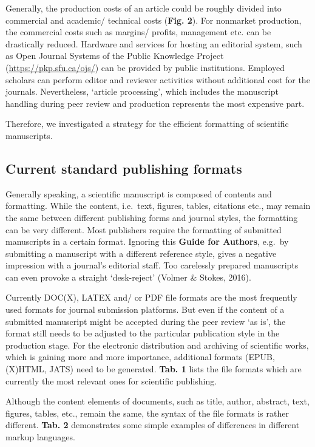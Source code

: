 \documentclass[10pt,fleqn]{wlpeerj}
\begin{document}
Generally, the production costs of an article could be roughly divided
into commercial and academic/ technical costs (\textbf{Fig. 2}). For
nonmarket production, the commercial costs such as margins/ profits,
management etc. can be drastically reduced. Hardware and services for
hosting an editorial system, such as Open Journal Systems of the Public
Knowledge Project (\url{https://pkp.sfu.ca/ojs/}) can be provided by
public institutions. Employed scholars can perform editor and reviewer
activities without additional cost for the journals. Nevertheless,
`article processing', which includes the manuscript handling during peer
review and production represents the most expensive part.

Therefore, we investigated a strategy for the efficient formatting of
scientific manuscripts.

\subsection{Current standard publishing
formats}\label{current-standard-publishing-formats}

Generally speaking, a scientific manuscript is composed of contents and
formatting. While the content, i.e.~text, figures, tables, citations
etc., may remain the same between different publishing forms and journal
styles, the formatting can be very different. Most publishers require
the formatting of submitted manuscripts in a certain format. Ignoring
this \textbf{Guide for Authors}, e.g.~by submitting a manuscript with a
different reference style, gives a negative impression with a journal's
editorial staff. Too carelessly prepared manuscripts can even provoke a
straight `desk-reject' (Volmer \& Stokes, 2016).

Currently DOC(X), LATEX and/ or PDF file formats are the most frequently
used formats for journal submission platforms. But even if the content
of a submitted manuscript might be accepted during the peer review `as
is', the format still needs to be adjusted to the particular publication
style in the production stage. For the electronic distribution and
archiving of scientific works, which is gaining more and more
importance, additional formats (EPUB, (X)HTML, JATS) need to be
generated. \textbf{Tab. 1} lists the file formats which are currently
the most relevant ones for scientific publishing.

Although the content elements of documents, such as title, author,
abstract, text, figures, tables, etc., remain the same, the syntax of
the file formats is rather different. \textbf{Tab. 2} demonstrates some
simple examples of differences in different markup languages.
\end{document}

